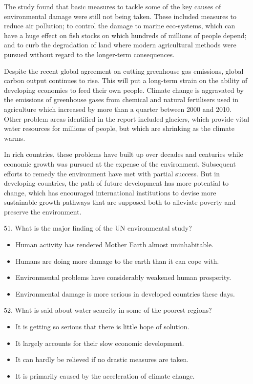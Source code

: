 \documentclass[UTF8,11pt]{ctexart}
\begin{document}
The study found that basic measures to tackle some of the key causes of environmental damage were still not being taken. These included measures to reduce air pollution; to control the damage to marine eco-systems, which can have a huge effect on fish stocks on which hundreds of millions of people depend; and to curb the degradation of land where modern agricultural methods were pursued without regard to the longer-term consequences.


Despite the recent global agreement on cutting greenhouse gas emissions, global carbon output continues to rise. This will put a long-term strain on the ability of developing economies to feed their own people. Climate change is aggravated by the emissions of greenhouse gases from chemical and natural fertilisers used in agriculture which increased by more than a quarter between 2000 and 2010. Other problem areas identified in the report included glaciers, which provide vital water resources for millions of people, but which are shrinking as the climate warms.


In rich countries, these problems have built up over decades and centuries while economic growth was pursued at the expense of the environment. Subsequent efforts to remedy the environment have met with partial success. But in developing countries, the path of future development has more potential to change, which has encouraged international institutions to devise more sustainable growth pathways that are supposed both to alleviate poverty and preserve the environment.


51. What is the major finding of the UN environmental study?


\begin{itemize}[leftmargin=2em,itemsep=.2em,topsep=.4em]\item[A.] Human activity has rendered Mother Earth almost uninhabitable.
\item[B.] Humans are doing more damage to the earth than it can cope with.
\item[C.] Environmental problems have considerably weakened human prosperity.
\item[D.] Environmental damage is more serious in developed countries these days.
\end{itemize}

52. What is said about water scarcity in some of the poorest regions?


\begin{itemize}[leftmargin=2em,itemsep=.2em,topsep=.4em]\item[A.] It is getting so serious that there is little hope of solution.
\item[B.] It largely accounts for their slow economic development.
\item[C.] It can hardly be relieved if no drastic measures are taken.
\item[D.] It is primarily caused by the acceleration of climate change.
\end{itemize}
\end{document}
